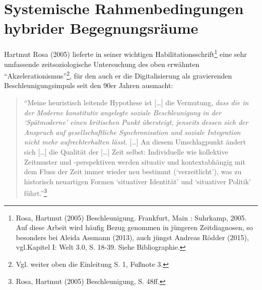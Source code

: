 \documentclass[a4paper,
fontsize=11pt,
oneside,
numbers=noperiodatend,
parskip=half-,
bibliography=totoc,
final
]{scrartcl}
\begin{document}
\section*{Systemische Rahmenbedingungen hybrider
Begegnungsräume}\label{systemische-rahmenbedingungen-hybrider-begegnungsruxe4ume}

Hartmut Rosa (2005) lieferte in seiner wichtigen
Habilitationsschrift\footnote{Rosa, Hartmut (2005) Beschleunigung.
  Frankfurt, Main : Suhrkamp, 2005. Auf diese Arbeit wird häufig Bezug
  genommen in jüngeren Zeitdiagnosen, so besonders bei Aleida Assmann
  (2013), auch jüngst Andreas Rödder (2015), vgl.Kapitel I: Welt 3.0, S.
  18-39. Siehe Bibliographie.} eine sehr umfassende zeitsoziologische
Untersuchung des oben erwähnten \enquote{Akzelerationismus}\footnote{Vgl.
  weiter oben die Einleitung S. 1, Fußnote 3.}, für den auch er die
Digitalisierung als gravierenden Beschleunigungsimpuls seit den 90er
Jahren ausmacht:

\begin{quote}
\enquote{Meine heuristisch leitende Hypothese ist {[}\ldots{}{]} die
Vermutung, \emph{dass die in der Moderne konstitutiv angelegte soziale
Beschleunigung in der \enquote{Spätmoderne} einen kritischen Punkt
übersteigt, jenseits dessen sich der Anspruch auf gesellschaftliche
Synchronisation und soziale Integration nicht mehr aufrechterhalten
lässt.} {[}\ldots{}{]} An diesem Umschlagpunkt ändert sich
{[}\ldots{}{]} die Qualität der {[}\ldots{}{]} Zeit selbst: Individuelle
wie kollektive Zeitmuster und -perspektiven werden situativ und
kontextabhängig mit dem Fluss der Zeit immer wieder neu bestimmt
(\enquote{verzeitlicht}), was zu historisch neuartigen Formen
\enquote{situativer Identität} und \enquote{situativer Politik}
führt.}\footnote{Rosa, Hartmut (2005) Beschleunigung, S. 48ff.}
\end{quote}
\end{document}
